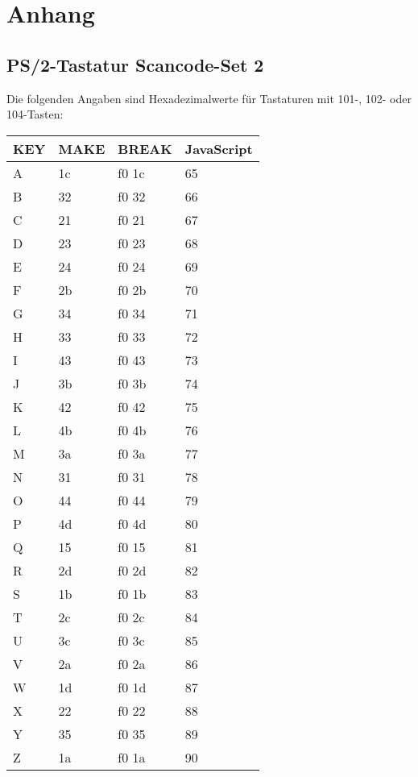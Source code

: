 \chapter{Anhang}
\section{PS/2-Tastatur Scancode-Set 2}
Die folgenden Angaben sind Hexadezimalwerte für Tastaturen mit 101-, 102- oder 104-Tasten:
\begin{longtable}{| p{} | p{} | p{} | p{} |}
  \hline
  \textbf{KEY} & \textbf{MAKE} & \textbf{BREAK} & \textbf{JavaScript}\\ \hline
  A & 1c & f0 1c & 65 \\ \hline
  B & 32 & f0 32 & 66 \\ \hline
  C & 21 & f0 21 & 67 \\ \hline
  D & 23 & f0 23 & 68 \\ \hline
  E & 24 & f0 24 & 69 \\ \hline
  F & 2b & f0 2b & 70 \\ \hline
  G & 34 & f0 34 & 71 \\ \hline
  H & 33 & f0 33 & 72 \\ \hline
  I & 43 & f0 43 & 73 \\ \hline
  J & 3b & f0 3b & 74 \\ \hline
  K & 42 & f0 42 & 75 \\ \hline
  L & 4b & f0 4b & 76 \\ \hline
  M & 3a & f0 3a & 77 \\ \hline
  N & 31 & f0 31 & 78 \\ \hline
  O & 44 & f0 44 & 79 \\ \hline
  P & 4d & f0 4d & 80 \\ \hline
  Q & 15 & f0 15 & 81 \\ \hline
  R & 2d & f0 2d & 82 \\ \hline
  S & 1b & f0 1b & 83 \\ \hline
  T & 2c & f0 2c & 84 \\ \hline
  U & 3c & f0 3c & 85 \\ \hline
  V & 2a & f0 2a & 86 \\ \hline
  W & 1d & f0 1d & 87 \\ \hline
  X & 22 & f0 22 & 88 \\ \hline
  Y & 35 & f0 35 & 89 \\ \hline
  Z & 1a & f0 1a & 90 \\ \hline

\end{longtable}
